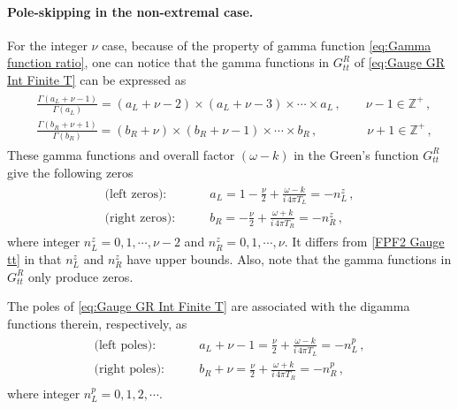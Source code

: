 \documentclass[11pt,a4paper]{article}
\begin{document}
\paragraph{Pole-skipping in the non-extremal case.}
For the integer $\nu$ case, because of the property of gamma function \eqref{eq:Gamma function ratio}, one can notice that the gamma functions in $G^R_{tt}$ of \eqref{eq:Gauge GR Int Finite T} can be expressed as
\begin{align} \label{GMFR12 Vector}
\begin{split}
&\frac{\Gamma(a_{L}+\nu-1)}{\Gamma(a_{L})}=\left(a_{L}+\nu-2\right)\times \left(a_{L}+\nu-3\right)\times \cdots \times a_{L} \,, \qquad \nu-1 \in \mathbb{Z}^{+} \,, \\
%
&\frac{\Gamma(b_{R}+\nu+1)}{\Gamma(b_{R})}= \left(b_{R}+\nu\right)\times \left(b_{R}+\nu-1\right) \times \cdots \times b_{R} \,, \qquad \qquad \nu+1 \in \mathbb{Z}^{+} \,,
\end{split}
\end{align}
These gamma functions and overall factor $(\omega-k)$ in the Green's function $G^R_{tt}$ give the following zeros
\begin{align} \label{zerosnhi1 Gauge tt}
\begin{split}
    \text{(left zeros):} \qquad & a_L = 1-\frac{\nu}{2} + \frac{\omega-k}{i\, 4 \pi T_L} = - n^z_L\,,\\
    \text{(right zeros):} \qquad & b_R = - \frac{\nu}{2} + \frac{\omega+k}{i\, 4 \pi T_R} = - n^z_R\,,
\end{split}
\end{align}
where integer $n^z_L=0,1,\cdots,\nu-2$ and $n^z_R=0,1,\cdots,\nu$. It differs from \eqref{FPF2 Gauge tt} in that $n^z_L$ and $n^z_R$ have upper bounds. Also, note that the gamma functions in $G^R_{tt}$ only produce zeros.

The poles of \eqref{eq:Gauge GR Int Finite T} are associated with the digamma functions therein, respectively, as
\begin{align} \label{polesnhi1 Gauge tt}
\begin{split}
    \text{(left poles):} \qquad & a_L+\nu-1 = \frac{\nu}{2} + \frac{\omega-k}{i\, 4 \pi T_L} = - n^p_L\,,\\
    \text{(right poles):} \qquad & b_R+\nu = \frac{\nu}{2} + \frac{\omega+k}{i\, 4 \pi T_R} = - n^p_R\,,
\end{split}
\end{align}
where integer $n^p_L=0,1,2,\cdots$.\\
\end{document}
